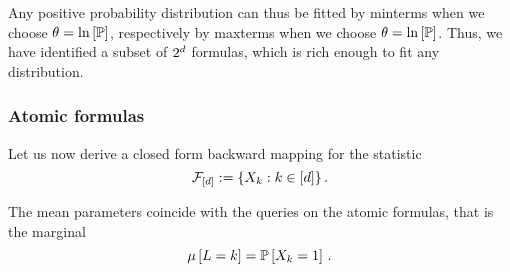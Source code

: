 	

	

	
Any positive probability distribution can thus be fitted by minterms when we choose $\theta=\ln \left[ \mathbb{P} \right]$, respectively by maxterms when we choose $\theta=\ln \left[ \mathbb{P} \right]$.
Thus, we have identified a subset of $2^{d}$ formulas, which is rich enough to fit any distribution.





\subsubsection{Atomic formulas}

Let us now derive a closed form backward mapping for the statistic
	\[ \mathcal{F}_{[d]} := \{X_{k}: k\in[d]\} \, . \]

The mean parameters coincide with the queries on the atomic formulas, that is the marginal 
	\[ \mu\left[L=k\right] = \mathbb{P}\left[X_{k}=1\right]  \, . \]

